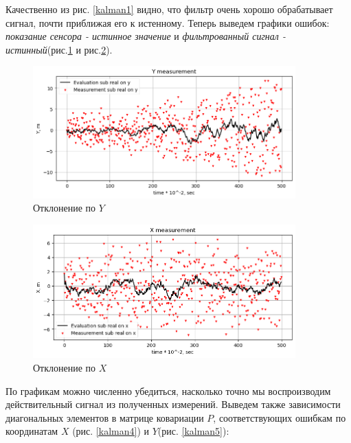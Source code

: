 \documentclass[a4paper,11pt]{article} %
\begin{document}
Качественно из рис. \ref{kalman1} видно, что фильтр очень хорошо обрабатывает сигнал,  почти приближая его к истенному. Теперь выведем графики ошибок: \textit{показание сенсора - истинное значение} и \textit{фильтрованный сигнал - истинный}(рис.\ref{kalman2} и рис.\ref{kalman3}).

\begin{figure}[h!]
\begin{center}
\includegraphics[width=0.9\textwidth]{images/kalmanfilter2.png}
\end{center}
\caption{Отклонение по $Y$} \label{kalman2}
\end{figure}

\begin{figure}[h!]
\begin{center}
\includegraphics[width=0.9\textwidth]{images/kalmanfilter3.png}
\end{center}
\caption{Отклонение по $X$} \label{kalman3}
\end{figure}
По графикам можно численно убедиться, насколько точно мы воспроизводим действительный сигнал из  полученных измерений. Выведем также зависимости диагональных элементов в матрице ковариации $P$, соответствующих ошибкам по координатам $X$ (рис. \ref{kalman4}) и $Y$(рис. \ref{kalman5}):
\end{document}
